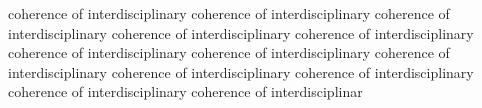 \documentclass{article}
\begin{document}
coherence of interdisciplinary coherence of interdisciplinary coherence of interdisciplinary coherence of interdisciplinary coherence of interdisciplinary coherence of interdisciplinary coherence of interdisciplinary coherence of interdisciplinary coherence of interdisciplinary coherence of interdisciplinary coherence of interdisciplinary coherence of interdisciplinar
\end{document}
